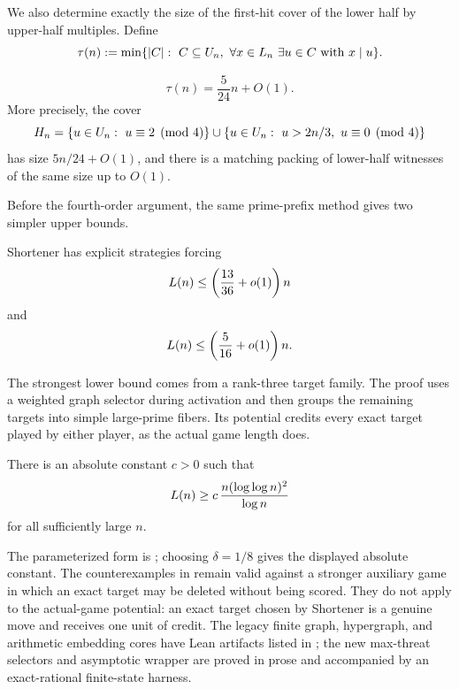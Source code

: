 We also determine exactly the size of the first-hit cover of the lower half by
upper-half multiples.  Define
\[
  \tau(n):=\min\{|C|:\ C\subseteq U_n,\ \forall x\in L_n\ \exists u\in C
  \text{ with }x\mid u\}.
\]

\begin{theorem}\label{thm:intro-cover}
\[
  \tau(n)=\frac{5}{24}n+O(1).
\]
More precisely, the cover
\[
  H_n=\{u\in\U_n:\ u\equiv2\pmod4\}
  \cup
  \{u\in\U_n:\ u>2n/3,\ u\equiv0\pmod4\}
\]
has size $5n/24+O(1)$, and there is a matching packing of lower-half
witnesses of the same size up to $O(1)$.
\end{theorem}

Before the fourth-order argument, the same prime-prefix method gives two
simpler upper bounds.

\begin{theorem}\label{thm:intro-intermediate}
Shortener has explicit strategies forcing
\[
  L(n)\le \left(\frac{13}{36}+o(1)\right)n
\]
and
\[
  L(n)\le \left(\frac{5}{16}+o(1)\right)n.
\]
\end{theorem}

The strongest lower bound comes from a rank-three target family.  The proof
uses a weighted graph selector during activation and then groups the remaining
targets into simple large-prime fibers.  Its potential credits every exact
target played by either player, as the actual game length does.

\begin{theorem}\label{thm:intro-t2}
There is an absolute constant $c>0$ such that
\[
  L(n)\ge c\,\frac{n(\log\log n)^2}{\log n}
\]
for all sufficiently large $n$.
\end{theorem}

The parameterized form is ; choosing $\delta=1/8$ gives the
displayed absolute constant.  The counterexamples in
 remain
valid against a stronger auxiliary game in which an exact target may be
deleted without being scored.  They do not apply to the actual-game potential:
an exact target chosen by Shortener is a genuine move and receives one unit of
credit.  The legacy finite graph, hypergraph, and arithmetic embedding cores
have Lean artifacts listed in ; the new max-threat
selectors and asymptotic wrapper are proved in prose and accompanied by an
exact-rational finite-state harness.

